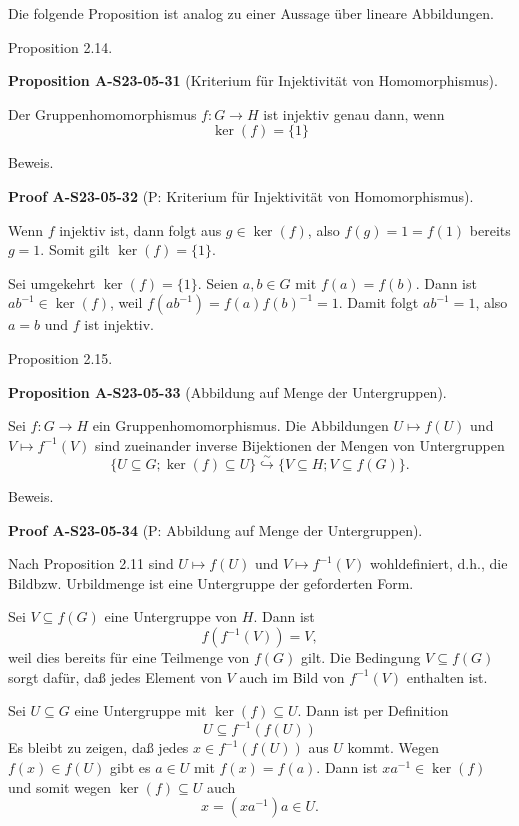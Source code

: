 \documentclass[10pt, letterpaper]{article}
\newcommand{\CustomHeading}[3]{%
  \par\medskip\noindent%
  \textbf{#1 #2} \textnormal{(#3)}.\enskip%
}
\newenvironment{PROP}[2]{\begin{unitbox}\CustomHeading{Proposition}{#1}{#2}}{\end{unitbox}}
\newenvironment{PROOF}[2]{\begin{unitbox}\CustomHeading{Proof}{#1}{#2}}{\end{unitbox}}
\begin{document}
Die folgende Proposition ist analog zu einer Aussage über lineare Abbildungen.


Proposition 2.14. 


\begin{PROP}{A-S23-05-31}{Kriterium für Injektivität von Homomorphismus}
Der Gruppenhomomorphismus $f: G \rightarrow H$ ist injektiv genau dann, wenn
$$
\operatorname{ker}(f)=\{1\}
$$
\end{PROP}

Beweis. 

\begin{PROOF}{A-S23-05-32}{P: Kriterium für Injektivität von Homomorphismus}
Wenn $f$ injektiv ist, dann folgt aus $g \in \operatorname{ker}(f)$, also $f(g)=1=f(1)$ bereits $g=1$. Somit gilt $\operatorname{ker}(f)=\{1\}$.

Sei umgekehrt $\operatorname{ker}(f)=\{1\}$. Seien $a, b \in G$ mit $f(a)=f(b)$. Dann ist $a b^{-1} \in \operatorname{ker}(f)$, weil $f\left(a b^{-1}\right)=f(a) f(b)^{-1}=1$. Damit folgt $a b^{-1}=1$, also $a=b$ und $f$ ist injektiv.
\end{PROOF}

Proposition 2.15. 

\begin{PROP}{A-S23-05-33}{Abbildung auf Menge der Untergruppen}
Sei $f: G \rightarrow H$ ein Gruppenhomomorphismus. Die Abbildungen $U \mapsto f(U)$ und $V \mapsto f^{-1}(V)$ sind zueinander inverse Bijektionen der Mengen von Untergruppen
$$
\{U \subseteq G ; \operatorname{ker}(f) \subseteq U\} \stackrel{\sim}{\hookrightarrow}\{V \subseteq H ; V \subseteq f(G)\} .
$$
\end{PROP}

Beweis. 


\begin{PROOF}{A-S23-05-34}{P: Abbildung auf Menge der Untergruppen}
Nach Proposition 2.11 sind $U \mapsto f(U)$ und $V \mapsto f^{-1}(V)$ wohldefiniert, d.h., die Bildbzw. Urbildmenge ist eine Untergruppe der geforderten Form.

Sei $V \subseteq f(G)$ eine Untergruppe von $H$. Dann ist
$$
f\left(f^{-1}(V)\right)=V,
$$
weil dies bereits für eine Teilmenge von $f(G)$ gilt. Die Bedingung $V \subseteq f(G)$ sorgt dafür, daß jedes Element von $V$ auch im Bild von $f^{-1}(V)$ enthalten ist.

Sei $U \subseteq G$ eine Untergruppe mit $\operatorname{ker}(f) \subseteq U$. Dann ist per Definition
$$
U \subseteq f^{-1}(f(U))
$$
Es bleibt zu zeigen, daß jedes $x \in f^{-1}(f(U))$ aus $U$ kommt. Wegen $f(x) \in f(U)$ gibt es $a \in U$ mit $f(x)=f(a)$. Dann ist $x a^{-1} \in \operatorname{ker}(f)$ und somit wegen $\operatorname{ker}(f) \subseteq U$ auch
$$
x=\left(x a^{-1}\right) a \in U .
$$
\end{PROOF}
\end{document}
